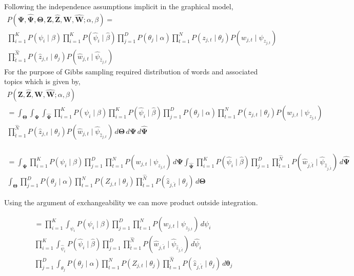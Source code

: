 \documentclass[a4paper]{article}
\begin{document}
Following the independence assumptions implicit in the graphical model,
\begin{multline}
P(\mathbf{\Psi}, \mathbf{\hat{\Psi}}, \mathbf{\Theta},  \mathbf{Z}, \mathbf{\hat{Z}}, \mathbf{W}, \mathbf{\hat{W}} ; \alpha, \beta) = \\
\prod_{i=1}^{K} P(\psi_{i} \mid \beta) \prod_{i=1}^{K} P(\hat{\psi}_{i} \mid \hat{\beta}) \prod_{j=1}^{D} P(\theta_{j} \mid \alpha) \prod_{t=1}^{N} P(z_{j,t} \mid \theta_{j})P(w_{j,t} \mid \psi_{z_{j,t}}) \\ \prod_{\hat{t}=1}^{\hat{N}} P(\hat{z}_{j,t} \mid \theta_{j})P(\hat{w}_{j,t} \mid \hat{\psi}_{\hat{z}_{j,t}})
\end{multline}
For the purpose of Gibbs sampling required distribution of words and associated topics which is given by, 
\begin{multline}
P(\mathbf{Z}, \mathbf{\hat{Z}}, \mathbf{W}, \mathbf{\hat{W}} ; \alpha, \beta) \\ =  
\int_{\mathbf{\Theta}} \int_{\mathbf{\Psi}} \int_{\mathbf{\hat{\Psi}}} \prod_{i=1}^{K} P(\psi_{i} \mid \beta) \prod_{i=1}^{K} P(\hat{\psi}_{i} \mid \hat{\beta}) \prod_{j=1}^{D} P(\theta_{j} \mid \alpha) \prod_{t=1}^{N} P(z_{j,t} \mid \theta_{j})P(w_{j,t} \mid \psi_{z_{j,t}})\\ \prod_{\hat{t}=1}^{\hat{N}} P(\hat{z}_{j,t} \mid \theta_{j})P(\hat{w}_{j,t} \mid \hat{\psi}_{\hat{z}_{j,t}})\,d\mathbf{\Theta} \,d\mathbf{\Psi} \,d\mathbf{\hat{\Psi}} \\
\end{multline}

\begin{multline}
= \int_{\mathbf{\Psi}} \prod_{i=1}^{K} P(\psi_{i} \mid \beta) \prod_{j=1}^{D} \prod_{t=1}^{N}P(w_{j,t} \mid \psi_{z_{j,t}})\,d\mathbf{\Psi}
\int_{\mathbf{\hat{\Psi}}} \prod_{i=1}^{K}P(\hat{\psi}_{i} \mid \hat{\beta}) \prod_{j=1}^{D} \prod_{\hat{t} =1}^{\hat{N}}P(\hat{w}_{j,\hat{t}} \mid \hat{\psi}_{\hat{z}_{j,\hat{t}}}) \,d\mathbf{\hat{\Psi}}\\
\int_{\mathbf{\Theta}} \prod_{j=1}^{D}P(\theta_{j} \mid \alpha) \prod_{t=1}^{N} P(Z_{j,t} \mid \theta_{j})\prod_{\hat{t}=1}^{\hat{N}} P(\hat{z}_{j,\hat{t}} \mid \theta_{j})\,d\mathbf{\Theta}
\end{multline}

Using the argument of exchangeability we can move product outside integration. 

\begin{multline}
=\prod_{i=1}^{K}  \int_{\psi_{i}} P(\psi_{i} \mid \beta) \prod_{j=1}^{D} \prod_{t=1}^{N}P(w_{j,t} \mid \psi_{z_{j,t}})\,d\psi_{i}\\
\prod_{i=1}^{K} \int_{\hat{\psi}_{i}} P(\hat{\psi}_{i} \mid \hat{\beta}) \prod_{j=1}^{D} \prod_{\hat{t} =1}^{\hat{N}}P(\hat{w}_{j,\hat{t}} \mid \hat{\psi}_{\hat{z}_{j,\hat{t}}}) \,d\hat{\psi}_{i}\\
\prod_{j=1}^{D} \int_{\theta_{j}} P(\theta_{j} \mid \alpha) \prod_{t=1}^{N} P(Z_{j,t} \mid \theta_{j})\prod_{\hat{t}=1}^{\hat{N}} P(\hat{z}_{j,\hat{t}} \mid \theta_{j})\,d\mathbf{\theta_{\textit{j}}}
\end{multline}
\end{document}
